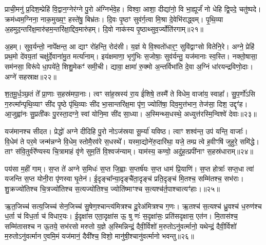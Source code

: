 {\anuvakamend[{दी॒या॒ दा॒यो ज॑यन्त्व॒मित्रा॒न्प्र च॑त्वारि॒ꣳ॒शच्च॑॥४॥}]}

प्राची॒मनु॑ प्र॒दिश॒म्प्रेहि॑ वि॒द्वान॒ग्नेर॑ग्ने पु॒रो अ॑ग्निर्भवे॒ह। विश्वा॒ आशा॒ दीद्या॑नो॒ वि भा॒ह्यूर्जं॑ नो धेहि द्वि॒पदे॒ चतु॑ष्पदे। क्रम॑ध्वम॒ग्निना॒ नाक॒मुख्य॒ꣳ॒ हस्ते॑षु॒ बिभ्र॑तः। दि॒वः पृ॒ष्ठꣳ सुव॑र्ग॒त्वा मि॒श्रा दे॒वेभि॑राद्ध्वम्। पृ॒थि॒व्या अ॒हमुद॒न्तरि॑क्ष॒मारु॑हम॒न्तरि॑क्षा॒द्दिव॒मारु॑हम्। दि॒वो नाक॑स्य पृ॒ष्ठाथ्सुव॒र्ज्योति॑रगाम्॥२१॥

अ॒हम्। सुव॒र्यन्तो॒ नापे᳚क्षन्त॒ आ द्याꣳ रो॑हन्ति॒ रोद॑सी। य॒ज्ञं ये वि॒श्वतो॑धार॒ꣳ॒ सुवि॑द्वाꣳसो वितेनि॒रे। अग्ने॒ प्रेहि॑ प्रथ॒मो दे॑वय॒तां चक्षु॑र्दे॒वाना॑मु॒त मर्त्या॑नाम्। इय॑क्षमाणा॒ भृगु॑भिः स॒जोषाः॒ सुव॑र्यन्तु॒ यज॑मानाः स्व॒स्ति। नक्तो॒षासा॒ सम॑नसा॒ विरू॑पे धा॒पये॑ते॒ शिशु॒मेकꣳ॑ समी॒ची। द्यावा॒ क्षामा॑ रु॒क्मो अ॒न्तर्विभा॑ति दे॒वा अ॒ग्निं धा॑रयन्द्रविणो॒दाः। अग्ने॑ सहस्राक्ष॥२२॥

श॒त॒मू॒र्ध॒ञ्छ॒तं ते᳚ प्रा॒णाः स॒हस्र॑मपा॒नाः। त्वꣳ सा॑ह॒स्रस्य॑ रा॒य ई॑शिषे॒ तस्मै॑ ते विधेम॒ वाजा॑य॒ स्वाहा᳚। सु॒प॒र्णो॑\-ऽसि ग॒रुत्मा᳚न्पृथि॒व्याꣳ सी॑द पृ॒ष्ठे पृ॑थि॒व्याः सी॑द भा॒सान्तरि॑क्ष॒मा पृ॑ण॒ ज्योति॑षा॒ दिव॒मुत्त॑भान॒ तेज॑सा॒ दिश॒ उद्दृꣳ॑ह। आ॒जुह्वा॑नः सु॒प्रती॑कः पु॒रस्ता॒दग्ने॒ स्वां योनि॒मा सी॑द सा॒ध्या। अ॒स्मिन्थ्स॒धस्थे॒ अध्युत्त॑रस्मि॒न्विश्वे॑ देवाः॥२३॥

यज॑मानश्च सीदत। प्रेद्धो॑ अग्ने दीदिहि पु॒रो नो\-ऽज॑स्रया सू॒र्म्या॑ यविष्ठ। त्वाꣳ शश्व॑न्त॒ उप॑ यन्ति॒ वाजाः᳚। वि॒धेम॑ ते पर॒मे जन्म॑न्नग्ने वि॒धेम॒ स्तोमै॒रव॑रे स॒धस्थे᳚। यस्मा॒द्योने॑रु॒दारि॑था॒ यजे॒ तम्प्र त्वे ह॒वीꣳषि॑ जुहुरे॒ समि॑द्धे। ताꣳ स॑वि॒तुर्वरे᳚ण्यस्य चि॒त्रामाहं वृ॑णे सुम॒तिं वि॒श्वज॑न्याम्। याम॑स्य॒ कण्वो॒ अदु॑ह॒त्प्रपी॑नाꣳ स॒हस्र॑धाराम्॥२४॥

पय॑सा म॒हीं गाम्। स॒प्त ते॑ अग्ने स॒मिधः॑ स॒प्त जि॒ह्वाः स॒प्तर्\mbox{}ष॑यः स॒प्त धाम॑ प्रि॒याणि॑। स॒प्त होत्राः᳚ सप्त॒धा त्वा॑ यजन्ति स॒प्त योनी॒रा पृ॑णस्वा घृ॒तेन॑। ई॒दृङ्चा᳚न्या॒दृङ्चै॑ता॒दृङ्च॑ प्रति॒दृङ्च॑ मि॒तश्च॒ सम्मि॑तश्च॒ सभ॑राः। शु॒क्रज्यो॑तिश्च चि॒त्रज्यो॑तिश्च स॒त्यज्यो॑तिश्च॒ ज्योति॑ष्माꣳश्च स॒त्यश्च॑र्त॒पाश्चात्यꣳ॑हाः।॥२५॥

ऋ॒त॒जिच्च॑ सत्य॒जिच्च॑ सेन॒जिच्च॑ सु॒षेण॒श्चान्त्य॑मित्रश्च दू॒रेअ॑मित्रश्च ग॒णः। ऋ॒तश्च॑ स॒त्यश्च॑ ध्रु॒वश्च॑ ध॒रुण॑श्च ध॒र्ता च॑ विध॒र्ता च॑ विधार॒यः। ई॒दृक्षा॑स एता॒दृक्षा॑स ऊ॒ षु णः॑ स॒दृक्षा॑सः॒ प्रति॑सदृक्षास॒ एत॑न। मि॒तास॑श्च॒ सम्मि॑तासश्च न ऊ॒तये॒ सभ॑रसो मरुतो य॒ज्ञे अ॒स्मिन्निन्द्रं॒ दैवी॒र्विशो॑ म॒रुतो\-ऽनु॑वर्त्मानो॒ यथेन्द्रं॒ दैवी॒र्विशो॑ म॒रुतो\-ऽनु॑वर्त्मान ए॒वमि॒मं यज॑मानं॒ दैवी᳚श्च॒ विशो॒ मानु॑षी॒श्चानु॑वर्त्मानो भवन्तु॥२६॥

